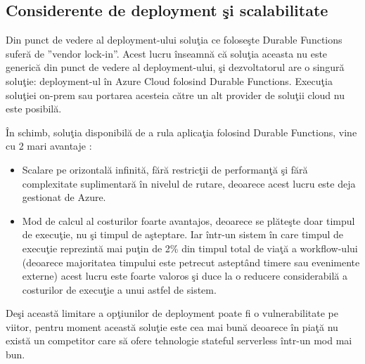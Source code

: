 \subsection{Considerente de deployment şi scalabilitate}
\quad Din punct de vedere al deployment-ului soluţia ce foloseşte Durable Functions suferă de ''vendor lock-in''. Acest lucru înseamnă că soluţia aceasta nu este generică din punct de vedere al deployment-ului, şi dezvoltatorul are o singură soluţie: deployment-ul în Azure Cloud folosind Durable Functions. Execuţia soluţiei on-prem sau portarea acesteia către un alt provider de soluţii cloud nu este posibilă. 
\par În schimb, soluţia disponibilă de a rula aplicaţia folosind Durable Functions, vine cu 2 mari avantaje : 
\begin{itemize}
\item Scalare pe orizontală infinită, fără restricţii de performanţă şi fără complexitate suplimentară în nivelul de rutare, deoarece acest lucru este deja gestionat de Azure.
\item Mod de calcul al costurilor foarte avantajos, deoarece se plăteşte doar timpul de execuţie, nu şi timpul de aşteptare. Iar într-un sistem în care timpul de execuţie reprezintă mai puţin de 2\% din timpul total de viaţă a workflow-ului (deoarece majoritatea timpului este petrecut asteptând timere sau evenimente externe) acest lucru este foarte valoros şi duce la o reducere considerabilă a costurilor de execuţie a unui astfel de sistem. 
\end{itemize}
\par Deşi această limitare a opţiunilor de deployment poate fi o vulnerabilitate pe viitor, pentru moment această soluţie este cea mai bună deoarece în piaţă nu există un competitor care să ofere tehnologie stateful serverless într-un mod mai bun.  
